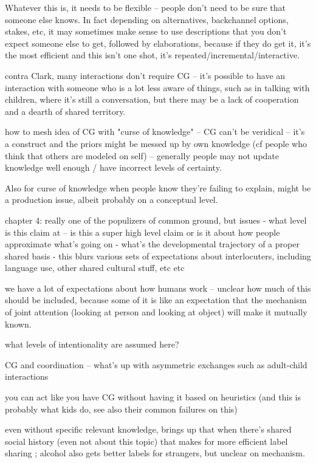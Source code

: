 \documentclass[]{article}
\begin{document}
Whatever this is, it needs to be flexible -- people don't need to be sure that someone else knows. In fact depending on alternatives, backchannel options, stakes, etc, it may sometimes make sense to use descriptions that you don't expect someone else to get, followed by elaborations, because if they do get it, it's the most efficient and this isn't one shot, it's repeated/incremental/interactive. 

\cite{clark1996} contra Clark, many interactions don't require CG -- it's possible to have an interaction with someone who is a lot less aware of things, such as in talking with children, where it's still a conversation, but there may be a lack of cooperation and a dearth of shared territory. 

how to mesh idea of CG with "curse of knowledge" -- CG can't be veridical -- it's a construct and the priors might be messed up by own knowledge (cf people who think that others are modeled on self) -- generally  people may not update knowledge well enough / have incorrect levels of certainty. 

Also for curse of knowledge when people know they're failing to explain, might be a production issue, albeit probably on a conceptual level. 

\cite{clark1996} chapter 4: really one of the populizers of common ground, but issues
- what level is this claim at -- is this a super high level claim or is it about how people approximate what's going on
- what's the developmental trajectory of a proper shared basis
- this blurs various sets of expectations about interlocuters, including language use, other shared cultural stuff, etc etc

we have a lot of expectations about how humans work -- unclear how much of this should be included, because some of it is like an expectation that the mechanism of joint attention (looking at person and looking at object) will make it mutually known. 

what levels of intentionality are assumed here? 

CG and coordination -- what's up with asymmetric exchanges such as adult-child interactions 

you can act like you have CG without having it based on heuristics (and this is probably what kids do, see also their common failures on this) 

even without specific relevant knowledge, \cite{garrison2022} brings up that when there's shared social history (even not about this topic) that makes for more efficient label sharing ; alcohol also gets better labels for strangers, but unclear on mechanism. 
\end{document}
